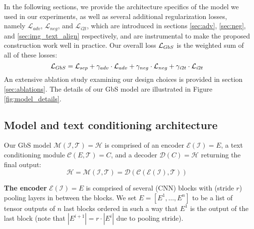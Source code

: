 \documentclass[10pt,twocolumn,letterpaper]{article}
\def\oursspace{{GbS }}
\newcommand\secvspace{\vspace{-0.0cm}}
\begin{document}
In the following sections, we provide the architecture specifics of the model we used in our experiments, as well as several additional regularization losses, namely $\mathcal{L}_{adv}$, $\mathcal{L}_{neg}$, and $\mathcal{L}_{i2t}$, which are introduced in sections \ref{sec:adv}, \ref{sec:neg}, and \ref{sec:img_text_align} respectively, and are instrumental to make the proposed construction work well in practice. 
Our overall loss $\mathcal{L}_{{GbS}}$ is the weighted sum of all of these losses:
\begin{equation}
    \mathcal{L}_{{GbS}} = 
    \mathcal{L}_{sep} 
    + \gamma_{adv}\cdot\mathcal{L}_{adv}
    + \gamma_{neg}\cdot\mathcal{L}_{neg}
    + \gamma_{i2t}\cdot\mathcal{L}_{i2t}
\end{equation}
An extensive ablation study examining our design choices is provided in section \ref{sec:ablations}. The details of our \oursspace model are illustrated in Figure \ref{fig:model_details}.

\secvspace
\subsection{Model and text conditioning architecture}\label{sec:arch}
\secvspace
Our \oursspace model $\mathcal{M}(\mathcal{I}, \mathcal{T}) = \mathcal{H}$ is comprised of an encoder $\mathcal{E}(\mathcal{I})=E$, a text conditioning module $\mathcal{C}(E, \mathcal{T})=C$, and a decoder $\mathcal{D}(C) = \mathcal{H}$ returning the final output:
\begin{equation}
    \mathcal{H} = \mathcal{M}(\mathcal{I}, \mathcal{T}) = \mathcal{D}(\mathcal{C}(\mathcal{E}(\mathcal{I}), \mathcal{T}))
\end{equation}

\noindent\textbf{The encoder} $\mathcal{E}(\mathcal{I})=E$ is comprised of several (CNN) blocks with (stride $r$) pooling layers in between the blocks. We set $E = [E^1,\ldots,E^n]$ to be a list of tensor outputs of $n$ last blocks ordered in such a way that $E^1$ is the output of the last block (note that $|E^{i+1}| = r \cdot |E^i|$ due to pooling stride). 
\end{document}
